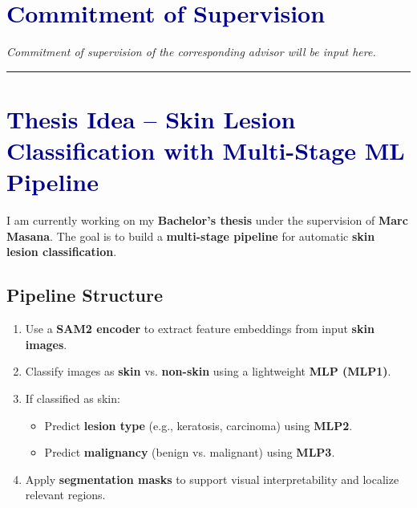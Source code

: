 \documentclass[10pt,a4paper]{article}
\begin{document}
\section*{\textcolor{darkblue}{Commitment of Supervision}}
\vspace{1em}

\textit{Commitment of supervision of the corresponding advisor will be input here.}

\vspace{2em}
\hrule
\vspace{2em}

\newpage
\section*{\textcolor{darkblue}{Thesis Idea – Skin Lesion Classification with Multi-Stage ML Pipeline}}

I am currently working on my \textbf{Bachelor's thesis} under the supervision of \textbf{Marc Masana}. The goal is to build a \textbf{multi-stage pipeline} for automatic \textbf{skin lesion classification}.

\subsection*{\textbf{Pipeline Structure}}
\begin{enumerate}
    \item Use a \textbf{SAM2 encoder} to extract feature embeddings from input \textbf{skin images}.
    \item Classify images as \textbf{skin} vs. \textbf{non-skin} using a lightweight \textbf{MLP (MLP1)}.
    \item If classified as skin:
    \begin{itemize}
        \item Predict \textbf{lesion type} (e.g., keratosis, carcinoma) using \textbf{MLP2}.
        \item Predict \textbf{malignancy} (benign vs. malignant) using \textbf{MLP3}.
    \end{itemize}
    \item Apply \textbf{segmentation masks} to support visual interpretability and localize relevant regions.
\end{enumerate}
\end{document}
